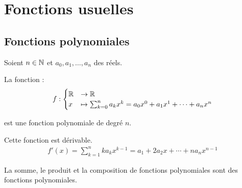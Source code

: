 \chapter{Fonctions usuelles}
\section{Fonctions polynomiales}
\begin{graybox}
	\begin{definition}
		\par Soient $n \in \mathbb{N}$ et $a_0, a_1, \ldots, a_n$ des réels.
		\par La fonction :
		\begin{align*}
			f : 
			\begin{cases}
				\mathbb{R} &\to \mathbb{R} \\
				x &\mapsto \sum_{k = 0}^{n}a_kx^k = a_0 x^0 + a_1 x^1 + \cdots + a_n x^n
			\end{cases}
		\end{align*}
		\par est une fonction polynomiale de degré $n$.
		\par Cette fonction est dérivable.
		\begin{align*}
			f'(x) = \sum_{k=1}^{n}ka_kx^{k-1} = a_1 + 2a_2x + \cdots + na_nx^{n-1}
		\end{align*}
	\end{definition}
\end{graybox}

\begin{remarque}
	La somme, le produit et la composition de fonctions polynomiales sont des fonctions polynomiales.
\end{remarque}

